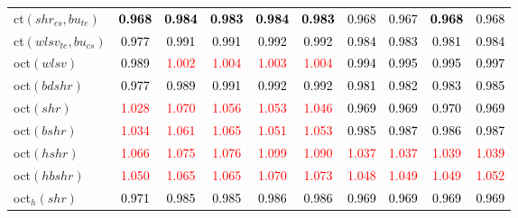 \begin{tabular}[t]{l|ccccccccc}
ct$(shr_{cs}, bu_{te})$ & \textcolor{black}{\textbf{0.968}} & \textcolor{black}{\textbf{0.984}} & \textcolor{black}{\textbf{0.983}} & \textcolor{black}{\textbf{0.984}} & \textcolor{black}{\textbf{0.983}} & \textcolor{black}{0.968} & \textcolor{black}{0.967} & \textcolor{black}{\textbf{0.968}} & \textcolor{black}{0.968}\\
ct$(wlsv_{te}, bu_{cs})$ & \textcolor{black}{0.977} & \textcolor{black}{0.991} & \textcolor{black}{0.991} & \textcolor{black}{0.992} & \textcolor{black}{0.992} & \textcolor{black}{0.984} & \textcolor{black}{0.983} & \textcolor{black}{0.981} & \textcolor{black}{0.984}\\
oct$(wlsv)$ & \textcolor{black}{0.989} & \textcolor{red}{1.002} & \textcolor{red}{1.004} & \textcolor{red}{1.003} & \textcolor{red}{1.004} & \textcolor{black}{0.994} & \textcolor{black}{0.995} & \textcolor{black}{0.995} & \textcolor{black}{0.997}\\
oct$(bdshr)$ & \textcolor{black}{0.977} & \textcolor{black}{0.989} & \textcolor{black}{0.991} & \textcolor{black}{0.992} & \textcolor{black}{0.992} & \textcolor{black}{0.981} & \textcolor{black}{0.982} & \textcolor{black}{0.983} & \textcolor{black}{0.985}\\
oct$(shr)$ & \textcolor{red}{1.028} & \textcolor{red}{1.070} & \textcolor{red}{1.056} & \textcolor{red}{1.053} & \textcolor{red}{1.046} & \textcolor{black}{0.969} & \textcolor{black}{0.969} & \textcolor{black}{0.970} & \textcolor{black}{0.969}\\
oct$(bshr)$ & \textcolor{red}{1.034} & \textcolor{red}{1.061} & \textcolor{red}{1.065} & \textcolor{red}{1.051} & \textcolor{red}{1.053} & \textcolor{black}{0.985} & \textcolor{black}{0.987} & \textcolor{black}{0.986} & \textcolor{black}{0.987}\\
oct$(hshr)$ & \textcolor{red}{1.066} & \textcolor{red}{1.075} & \textcolor{red}{1.076} & \textcolor{red}{1.099} & \textcolor{red}{1.090} & \textcolor{red}{1.037} & \textcolor{red}{1.037} & \textcolor{red}{1.039} & \textcolor{red}{1.039}\\
oct$(hbshr)$ & \textcolor{red}{1.050} & \textcolor{red}{1.065} & \textcolor{red}{1.065} & \textcolor{red}{1.070} & \textcolor{red}{1.073} & \textcolor{red}{1.048} & \textcolor{red}{1.049} & \textcolor{red}{1.049} & \textcolor{red}{1.052}\\
oct$_h(shr)$ & \textcolor{black}{0.971} & \textcolor{black}{0.985} & \textcolor{black}{0.985} & \textcolor{black}{0.986} & \textcolor{black}{0.986} & \textcolor{black}{0.969} & \textcolor{black}{0.969} & \textcolor{black}{0.969} & \textcolor{black}{0.969}\\

\end{tabular}
